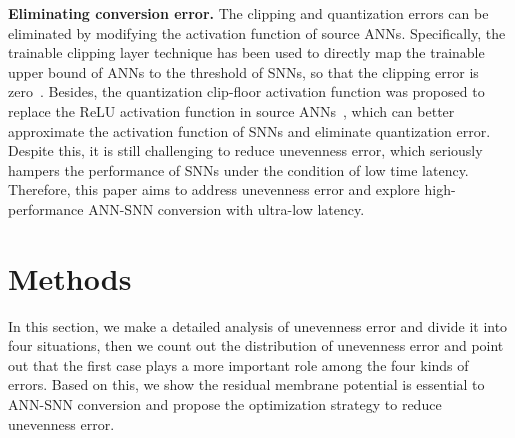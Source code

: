 \documentclass[letterpaper]{article} %
\begin{document}
\textbf{Eliminating conversion error.} The clipping and quantization errors can be eliminated by modifying the activation function of source ANNs. Specifically, the trainable clipping layer technique has been used to directly map the trainable upper bound of ANNs to the threshold of SNNs, so that the clipping error is zero~\cite{ho2021tcl}. Besides, the quantization clip-floor activation function was proposed to replace the ReLU activation function in source ANNs~\cite{bu2022optimal}, which can better approximate the activation function of SNNs and eliminate quantization error. Despite this, it is still challenging to reduce unevenness error, which seriously hampers the performance of SNNs under the condition of low time latency. Therefore, this paper aims to address unevenness error and explore high-performance
ANN-SNN conversion with ultra-low latency.




\section{Methods}
In this section, we make a detailed analysis of unevenness error and divide it into four situations, then we count out the distribution of unevenness error and point out that the first case plays a more important role among the four kinds of errors.
Based on this, we show the residual membrane potential is essential to ANN-SNN conversion and propose the optimization strategy to reduce unevenness error.
\end{document}
